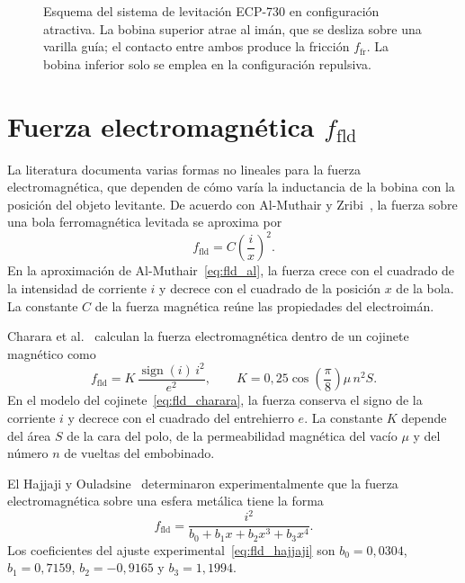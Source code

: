 \begin{figure}[ht]
    \centering
    
    \caption[Esquema del ECP-730 en configuración atractiva]{Esquema del sistema de levitación ECP-730 en configuración atractiva. La bobina superior atrae al imán, que se desliza sobre una varilla guía; el contacto entre ambos produce la fricción $f_{\text{fr}}$. La bobina inferior solo se emplea en la configuración repulsiva.}
    \label{fig:dispositivo}
\end{figure}

\section{\texorpdfstring{Fuerza electromagnética $f_{\text{fld}}$}{Fuerza electromagnética}}\label{sec:fuerza}

La literatura documenta varias formas no lineales para la fuerza electromagnética, que dependen de cómo varía la inductancia de la bobina con la posición del objeto levitante. De acuerdo con Al-Muthair y Zribi~\cite{al}, la fuerza sobre una bola ferromagnética levitada se aproxima por
\begin{equation}
f_{\text{fld}} = C\left(\dfrac{i}{x}\right)^2 .
\label{eq:fld_al}
\end{equation}
En la aproximación de Al-Muthair~\eqref{eq:fld_al}, la fuerza crece con el cuadrado de la intensidad de corriente $i$ y decrece con el cuadrado de la posición $x$ de la bola. La constante $C$ de la fuerza magnética reúne las propiedades del electroimán.

Charara et al.~\cite{charara} calculan la fuerza electromagnética dentro de un cojinete magnético como
\begin{equation}
f_{\text{fld}} = K\,\frac{\operatorname{sign}(i)\,i^{2}}{e^{2}},
\qquad
K = 0{,}25 \cos\!\left(\frac{\pi}{8}\right)\!\mu\, n^{2} S .
\label{eq:fld_charara}
\end{equation}
En el modelo del cojinete~\eqref{eq:fld_charara}, la fuerza conserva el signo de la corriente $i$ y decrece con el cuadrado del entrehierro $e$. La constante $K$ depende del área $S$ de la cara del polo, de la permeabilidad magnética del vacío $\mu$ y del número $n$ de vueltas del embobinado.

El Hajjaji y Ouladsine~\cite{el} determinaron experimentalmente que la fuerza electromagnética sobre una esfera metálica tiene la forma
\begin{equation}
f_{\text{fld}} = \dfrac{i^{2}}{b_0 + b_1x + b_2x^3 + b_3x^4} .
\label{eq:fld_hajjaji}
\end{equation}
Los coeficientes del ajuste experimental~\eqref{eq:fld_hajjaji} son $b_0=0{,}0304$, $b_1=0{,}7159$, $b_2=-0{,}9165$ y $b_3=1{,}1994$.


